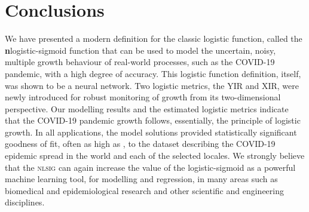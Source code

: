 \documentclass[journal]{IEEEtran}
\theoremstyle{plain}
\theoremstyle{definition}
\theoremstyle{remark}
\begin{document}
\section{Conclusions}\label{sec_concls}
We have presented a modern definition for the classic logistic function, called the \textbf{n}logistic-sigmoid function that can be used to model the uncertain, noisy, multiple growth behaviour of real-world processes, such as the COVID-19 pandemic, with a high degree of accuracy. This logistic function definition, itself, was shown to be a neural network. Two logistic metrics, the YIR and XIR, were newly introduced for robust monitoring of growth from its two-dimensional perspective. Our modelling results and the estimated logistic metrics indicate that the COVID-19 pandemic growth follows, essentially, the principle of logistic growth. In all applications, the model solutions provided statistically significant goodness of fit, often as high as , to the dataset describing the COVID-19 epidemic spread in the world and each of the selected locales. We strongly believe that the \textsc{nlsig} can again increase the value of the logistic-sigmoid as a powerful  machine learning tool, for modelling and regression, in many areas such as biomedical and epidemiological research and other scientific and engineering disciplines.






\end{document}
